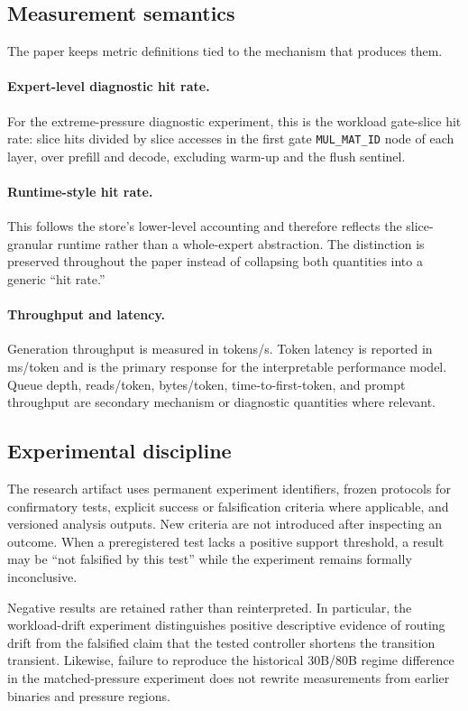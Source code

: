 \subsection{Measurement semantics}

The paper keeps metric definitions tied to the mechanism that produces them.

\paragraph{Expert-level diagnostic hit rate.}
For the extreme-pressure diagnostic experiment, this is the workload gate-slice hit rate: slice hits divided by slice accesses in the first gate \texttt{MUL\_MAT\_ID} node of each layer, over prefill and decode, excluding warm-up and the flush sentinel.

\paragraph{Runtime-style hit rate.}
This follows the store's lower-level accounting and therefore reflects the slice-granular runtime rather than a whole-expert abstraction. The distinction is preserved throughout the paper instead of collapsing both quantities into a generic ``hit rate.''

\paragraph{Throughput and latency.}
Generation throughput is measured in tokens/s. Token latency is reported in ms/token and is the primary response for the interpretable performance model. Queue depth, reads/token, bytes/token, time-to-first-token, and prompt throughput are secondary mechanism or diagnostic quantities where relevant.

\subsection{Experimental discipline}

The research artifact uses permanent experiment identifiers, frozen protocols for confirmatory tests, explicit success or falsification criteria where applicable, and versioned analysis outputs. New criteria are not introduced after inspecting an outcome. When a preregistered test lacks a positive support threshold, a result may be ``not falsified by this test'' while the experiment remains formally inconclusive.

Negative results are retained rather than reinterpreted. In particular, the workload-drift experiment distinguishes positive descriptive evidence of routing drift from the falsified claim that the tested controller shortens the transition transient. Likewise, failure to reproduce the historical 30B/80B regime difference in the matched-pressure experiment does not rewrite measurements from earlier binaries and pressure regions.

